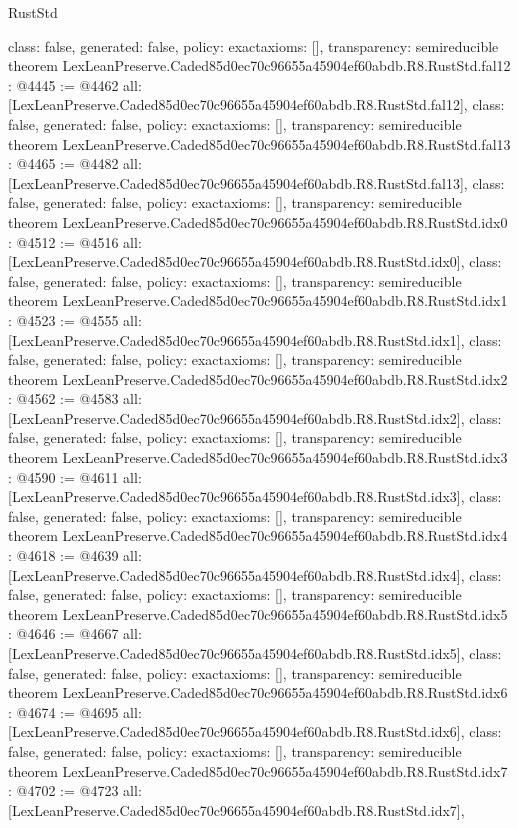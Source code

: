 \begin{lexlean}{RustStd}
\begin{coremodule}
{  class: false,
  generated: false,
  policy: exact{axioms: []},
  transparency: semireducible
}
theorem LexLeanPreserve.Caded85d0ec70c96655a45904ef60abdb.R8.RustStd.fal12 : @4445 := @4462 {
  all: [LexLeanPreserve.Caded85d0ec70c96655a45904ef60abdb.R8.RustStd.fal12],
  class: false,
  generated: false,
  policy: exact{axioms: []},
  transparency: semireducible
}
theorem LexLeanPreserve.Caded85d0ec70c96655a45904ef60abdb.R8.RustStd.fal13 : @4465 := @4482 {
  all: [LexLeanPreserve.Caded85d0ec70c96655a45904ef60abdb.R8.RustStd.fal13],
  class: false,
  generated: false,
  policy: exact{axioms: []},
  transparency: semireducible
}
theorem LexLeanPreserve.Caded85d0ec70c96655a45904ef60abdb.R8.RustStd.idx0 : @4512 := @4516 {
  all: [LexLeanPreserve.Caded85d0ec70c96655a45904ef60abdb.R8.RustStd.idx0],
  class: false,
  generated: false,
  policy: exact{axioms: []},
  transparency: semireducible
}
theorem LexLeanPreserve.Caded85d0ec70c96655a45904ef60abdb.R8.RustStd.idx1 : @4523 := @4555 {
  all: [LexLeanPreserve.Caded85d0ec70c96655a45904ef60abdb.R8.RustStd.idx1],
  class: false,
  generated: false,
  policy: exact{axioms: []},
  transparency: semireducible
}
theorem LexLeanPreserve.Caded85d0ec70c96655a45904ef60abdb.R8.RustStd.idx2 : @4562 := @4583 {
  all: [LexLeanPreserve.Caded85d0ec70c96655a45904ef60abdb.R8.RustStd.idx2],
  class: false,
  generated: false,
  policy: exact{axioms: []},
  transparency: semireducible
}
theorem LexLeanPreserve.Caded85d0ec70c96655a45904ef60abdb.R8.RustStd.idx3 : @4590 := @4611 {
  all: [LexLeanPreserve.Caded85d0ec70c96655a45904ef60abdb.R8.RustStd.idx3],
  class: false,
  generated: false,
  policy: exact{axioms: []},
  transparency: semireducible
}
theorem LexLeanPreserve.Caded85d0ec70c96655a45904ef60abdb.R8.RustStd.idx4 : @4618 := @4639 {
  all: [LexLeanPreserve.Caded85d0ec70c96655a45904ef60abdb.R8.RustStd.idx4],
  class: false,
  generated: false,
  policy: exact{axioms: []},
  transparency: semireducible
}
theorem LexLeanPreserve.Caded85d0ec70c96655a45904ef60abdb.R8.RustStd.idx5 : @4646 := @4667 {
  all: [LexLeanPreserve.Caded85d0ec70c96655a45904ef60abdb.R8.RustStd.idx5],
  class: false,
  generated: false,
  policy: exact{axioms: []},
  transparency: semireducible
}
theorem LexLeanPreserve.Caded85d0ec70c96655a45904ef60abdb.R8.RustStd.idx6 : @4674 := @4695 {
  all: [LexLeanPreserve.Caded85d0ec70c96655a45904ef60abdb.R8.RustStd.idx6],
  class: false,
  generated: false,
  policy: exact{axioms: []},
  transparency: semireducible
}
theorem LexLeanPreserve.Caded85d0ec70c96655a45904ef60abdb.R8.RustStd.idx7 : @4702 := @4723 {
  all: [LexLeanPreserve.Caded85d0ec70c96655a45904ef60abdb.R8.RustStd.idx7],
}
\end{coremodule}
\end{lexlean}
